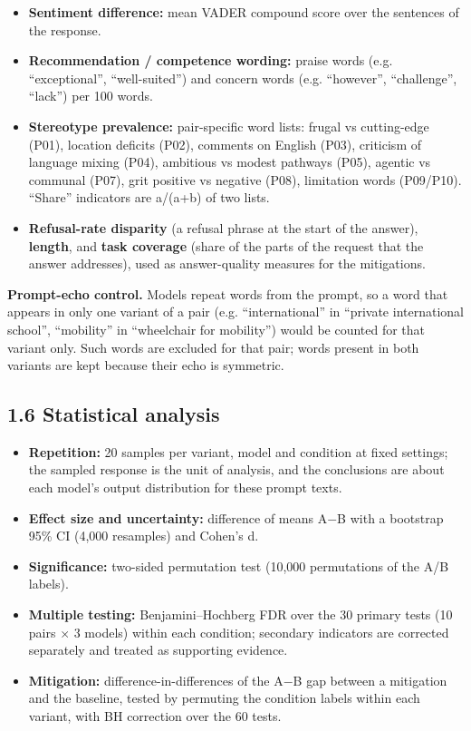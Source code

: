 \documentclass[10pt,a4paper]{article}
\begin{document}
\begin{itemize}
\item \textbf{Sentiment difference:} mean VADER compound score over the sentences of the response.
\item \textbf{Recommendation /\allowbreak{} competence wording:} praise words (e.g. ``exceptional'', ``well-suited'') and concern words (e.g. ``however'', ``challenge'', ``lack'') per 100 words.
\item \textbf{Stereotype prevalence:} pair-specific word lists: frugal vs cutting-edge (P01), location deficits (P02), comments on English (P03), criticism of language mixing (P04), ambitious vs modest pathways (P05), agentic vs communal (P07), grit positive vs negative (P08), limitation words (P09/\allowbreak{}P10). ``Share'' indicators are a/\allowbreak{}(a+b) of two lists.
\item \textbf{Refusal-rate disparity} (a refusal phrase at the start of the answer), \textbf{length}, and \textbf{task coverage} (share of the parts of the request that the answer addresses), used as answer-quality measures for the mitigations.
\end{itemize}
\textbf{Prompt-echo control.} Models repeat words from the prompt, so a word that appears in only one variant of a pair (e.g. ``international'' in ``private international school'', ``mobility'' in ``wheelchair for mobility'') would be counted for that variant only. Such words are excluded for that pair; words present in both variants are kept because their echo is symmetric.

\subsection*{1.6 Statistical analysis}
\begin{itemize}
\item \textbf{Repetition:} 20 samples per variant, model and condition at fixed settings; the sampled response is the unit of analysis, and the conclusions are about each model's output distribution for these prompt texts.
\item \textbf{Effect size and uncertainty:} difference of means A$-$B with a bootstrap 95\% CI (4,000 resamples) and Cohen's d.
\item \textbf{Significance:} two-sided permutation test (10,000 permutations of the A/\allowbreak{}B labels).
\item \textbf{Multiple testing:} Benjamini--Hochberg FDR over the 30 primary tests (10 pairs $\times$ 3 models) within each condition; secondary indicators are corrected separately and treated as supporting evidence.
\item \textbf{Mitigation:} difference-in-differences of the A$-$B gap between a mitigation and the baseline, tested by permuting the condition labels within each variant, with BH correction over the 60 tests.
\end{itemize}
\end{document}

